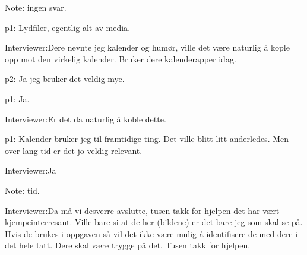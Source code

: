 \documentclass[../../MasterThesis.tex]{subfiles}
\begin{document}
\textcolor{myGrey}{Note:} ingen svar.

\textcolor{myGreen} {p1:} Lydfiler, egentlig alt av media.

\textcolor{myBlue} {Interviewer:}Dere nevnte jeg kalender og humør, ville det være naturlig å kople opp mot den virkelig kalender. Bruker dere kalenderapper idag.

\textcolor{myYellow} {p2:} Ja jeg bruker det veldig mye.

\textcolor{myGreen} {p1:} Ja.

\textcolor{myBlue} {Interviewer:}Er det da naturlig å koble dette.

\textcolor{myGreen} {p1:} Kalender bruker jeg til framtidige ting. Det ville blitt litt anderledes. Men over lang tid er det jo veldig relevant. 

\textcolor{myBlue} {Interviewer:}Ja

\textcolor{myGrey}{Note:} tid.

\textcolor{myBlue} {Interviewer:}Da må vi desverre avslutte, tusen takk for hjelpen det har vært kjempeinterresant. Ville bare si at de her (bildene) er det bare jeg som skal se på. Hvis de brukes i oppgaven så vil det ikke være mulig å identifisere de med dere i det hele tatt. Dere skal være trygge på det. Tusen takk for hjelpen. 
\end{document}
